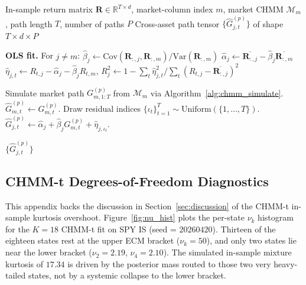 \begin{algorithm}[tp]
\caption{Single Index Model (SIM) construction and simulation}
\label{alg:sim_build}
\small
\begin{algorithmic}[1]
\REQUIRE In-sample return matrix $\mathbf{R} \in \mathbb{R}^{T \times d}$, market-column index $m$, market CHMM $\mathcal{M}_m$, path length $T$, number of paths $P$
\ENSURE Cross-asset path tensor $\{\hat{G}^{(p)}_{j,t}\}$ of shape $T \times d \times P$

\STATE \textbf{OLS fit.} For $j \neq m$:
\STATE \quad $\hat{\beta}_j \leftarrow \text{Cov}(\mathbf{R}_{:,j}, \mathbf{R}_{:,m}) / \text{Var}(\mathbf{R}_{:,m})$
\STATE \quad $\hat{\alpha}_j \leftarrow \overline{\mathbf{R}_{:,j}} - \hat{\beta}_j \overline{\mathbf{R}_{:,m}}$
\STATE \quad $\hat{\eta}_{j,t} \leftarrow R_{t,j} - \hat{\alpha}_j - \hat{\beta}_j R_{t,m}$, \; $R^2_j \leftarrow 1 - \sum_t \hat{\eta}_{j,t}^2 / \sum_t (R_{t,j} - \overline{\mathbf{R}_{:,j}})^2$

    \STATE Simulate market path $G_{m,1:T}^{(p)}$ from $\mathcal{M}_m$ via Algorithm~\ref{alg:chmm_simulate}.
    \STATE $\hat{G}_{m,t}^{(p)} \leftarrow G_{m,t}^{(p)}$.
        \STATE Draw residual indices $\{\iota_t\}_{t=1}^T \sim \text{Uniform}(\{1, \dots, T\})$.
        \STATE $\hat{G}_{j,t}^{(p)} \leftarrow \hat{\alpha}_j + \hat{\beta}_j G_{m,t}^{(p)} + \hat{\eta}_{j,\iota_t}$.
    \ENDFOR
\ENDFOR

\RETURN $\{\hat{G}^{(p)}_{j,t}\}$
\end{algorithmic}
\end{algorithm}



\subsection{CHMM-t Degrees-of-Freedom Diagnostics}
\label{sec:nu_diagnostics}

This appendix backs the discussion in Section~\ref{sec:discussion} of the CHMM-t in-sample kurtosis overshoot.
Figure~\ref{fig:nu_hist} plots the per-state $\nu_k$ histogram for the $K = 18$ CHMM-t fit on SPY IS (seed = $20260420$).
Thirteen of the eighteen states rest at the upper ECM bracket ($\nu_k = 50$), and only two states lie near the lower bracket ($\nu_2 = 2.19$, $\nu_4 = 2.10$).
The simulated in-sample mixture kurtosis of $17.34$ is driven by the posterior mass routed to those two very heavy-tailed states, not by a systemic collapse to the lower bracket.

